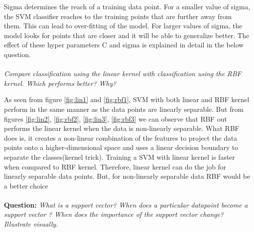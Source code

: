 \documentclass[12pt]{report}
\begin{document}
{Sigma determines the reach of a training data point. For a smaller value of sigma, the SVM classifier reaches to the training points that are further away from them. This can lead to over-fitting of the model. For larger values of sigma, the model looks for points that are closer and it will be able to generalize better. The effect of these hyper parameters C and sigma is explained in detail in the below question.\\\\
\textit{Compare classification using the linear kernel with classification using the RBF kernel. Which performs better? Why?}
 	 
 	 As seen from figure \ref{fig:lin1} and \ref{fig:rbf1}, SVM with both linear and RBF kernel perform in the same manner as the data points are linearly separable. But from figures \ref{fig:lin2}, \ref{fig:rbf2}, \ref{fig:lin3}, \ref{fig:rbf3} we can observe that RBF out performs the linear kernel when the data is non-linearly separable. What RBF does is, it creates a non-linear combination of the features to project the data points onto a higher-dimensional space and uses a linear decision boundary to separate the classes(kernel trick). Training a SVM with linear kernel is faster when compared to RBF kernel. Therefore, linear kernel can do the job for linearly separable data points. But, for non-linearly separable data RBF would be a better choice \\\\
{\bf Question:} \textit{ What is a support vector? When does a particular datapoint become a support vector ? When does the importance of the support vector change? Illustrate visually.}
	
}
\end{document}
